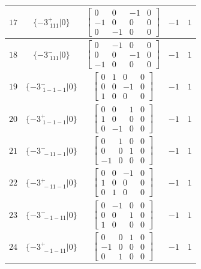\documentclass[fleqn,8pt]{jsarticle}
\begin{document}
\begin{longtable}{ccccc}
$ 17 $ & $ \{-3^{+}_{\,\,111}|0\} $ & $ \begin{bmatrix} 0 & 0 & -1 & 0 \\ -1 & 0 & 0 & 0 \\ 0 & -1 & 0 & 0 \end{bmatrix} $ & $ -1 $ & $ 1 $ \\ \hline
$ 18 $ & $ \{-3^{-}_{\,\,111}|0\} $ & $ \begin{bmatrix} 0 & -1 & 0 & 0 \\ 0 & 0 & -1 & 0 \\ -1 & 0 & 0 & 0 \end{bmatrix} $ & $ -1 $ & $ 1 $ \\ \hline
$ 19 $ & $ \{-3^{-}_{\,\,1-1-1}|0\} $ & $ \begin{bmatrix} 0 & 1 & 0 & 0 \\ 0 & 0 & -1 & 0 \\ 1 & 0 & 0 & 0 \end{bmatrix} $ & $ -1 $ & $ 1 $ \\ \hline
$ 20 $ & $ \{-3^{+}_{\,\,1-1-1}|0\} $ & $ \begin{bmatrix} 0 & 0 & 1 & 0 \\ 1 & 0 & 0 & 0 \\ 0 & -1 & 0 & 0 \end{bmatrix} $ & $ -1 $ & $ 1 $ \\ \hline
$ 21 $ & $ \{-3^{-}_{\,\,-11-1}|0\} $ & $ \begin{bmatrix} 0 & 1 & 0 & 0 \\ 0 & 0 & 1 & 0 \\ -1 & 0 & 0 & 0 \end{bmatrix} $ & $ -1 $ & $ 1 $ \\ \hline
$ 22 $ & $ \{-3^{+}_{\,\,-11-1}|0\} $ & $ \begin{bmatrix} 0 & 0 & -1 & 0 \\ 1 & 0 & 0 & 0 \\ 0 & 1 & 0 & 0 \end{bmatrix} $ & $ -1 $ & $ 1 $ \\ \hline
$ 23 $ & $ \{-3^{-}_{\,\,-1-11}|0\} $ & $ \begin{bmatrix} 0 & -1 & 0 & 0 \\ 0 & 0 & 1 & 0 \\ 1 & 0 & 0 & 0 \end{bmatrix} $ & $ -1 $ & $ 1 $ \\ \hline
$ 24 $ & $ \{-3^{+}_{\,\,-1-11}|0\} $ & $ \begin{bmatrix} 0 & 0 & 1 & 0 \\ -1 & 0 & 0 & 0 \\ 0 & 1 & 0 & 0 \end{bmatrix} $ & $ -1 $ & $ 1 $ \\ \hline

\end{longtable}
\end{document}
